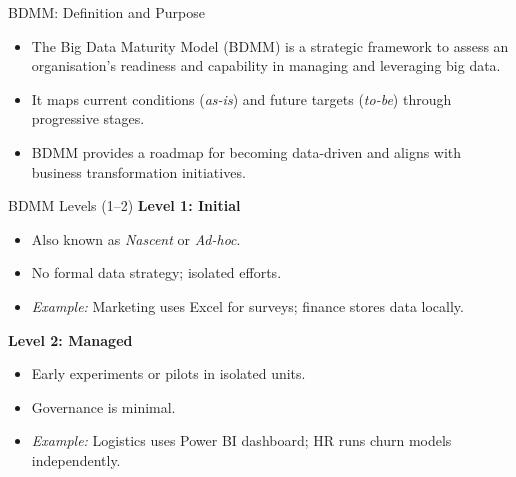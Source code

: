 \documentclass[aspectratio=169, table]{beamer}
\begin{document}
	\begin{frame}[fragile]{BDMM: Definition and Purpose}
		
		\begin{itemize}
			\item The Big Data Maturity Model (BDMM) is a strategic framework to assess an organisation's readiness and capability in managing and leveraging big data.
			\item It maps current conditions (\textit{as-is}) and future targets (\textit{to-be}) through progressive stages.
			\item BDMM provides a roadmap for becoming data-driven and aligns with business transformation initiatives.
		\end{itemize}
	\end{frame}
	
	\begin{frame}[fragile]{BDMM Levels (1--2)}
		\textbf{Level 1: Initial}
		\begin{itemize}
			\item Also known as \textit{Nascent} or \textit{Ad-hoc}.
			\item No formal data strategy; isolated efforts.
			\item \textit{Example:} Marketing uses Excel for surveys; finance stores data locally.
		\end{itemize}
		
		\textbf{Level 2: Managed}
		\begin{itemize}
			\item Early experiments or pilots in isolated units.
			\item Governance is minimal.
			\item \textit{Example:} Logistics uses Power BI dashboard; HR runs churn models independently.
		\end{itemize}
	\end{frame}
	
\end{document}
